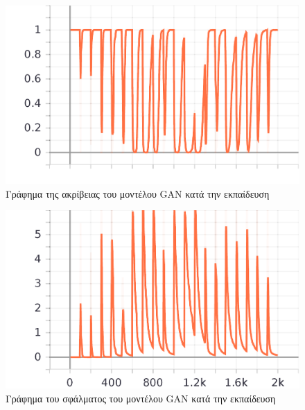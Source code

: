 \begin{figure}[H]
  \centering
  \includegraphics{../images/graphs/epoch_accuracy.png}
  \caption{Γράφημα της ακρίβειας του μοντέλου GAN κατά την εκπαίδευση}
\end{figure}

\begin{figure}[H]
  \centering
  \includegraphics{../images/graphs/epoch_loss.png}
  \caption{Γράφημα του σφάλματος του μοντέλου GAN κατά την εκπαίδευση}
\end{figure}


